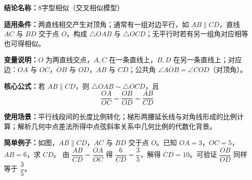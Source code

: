 \textbf{结论名称：}8字型相似（交叉相似模型）  

\textbf{适用条件：}两直线相交产生对顶角；通常有一组对边平行，如 $AB\parallel CD$，直线 $AC$ 与 $BD$ 交于点 $O$，构成 $\triangle OAB$ 与 $\triangle OCD$；无平行时若有另一组角对应相等也可得相似。  

\textbf{变量说明：}$O$ 为两直线交点，$A,C$ 在一条直线上，$B,D$ 在另一条直线上；对应边：$OA$ 与 $OC$，$OB$ 与 $OD$，$AB$ 与 $CD$；公共角 $\angle AOB = \angle COD$（对顶角）。  

\textbf{核心公式：}若 $AB\parallel CD$，则 $\triangle OAB \sim \triangle OCD$，且  
\[
\boxed{\frac{OA}{OC} = \frac{OB}{OD} = \frac{AB}{CD}}
\]  

\textbf{使用场景：}平行线段间的长度比例转化；梯形两腰延长线与对角线形成的比例计算；解析几何中点差法所得中点弦斜率关系中几何比例的代数化背景。  

\textbf{简单例子：}如图，$AB\parallel CD$，$AC$ 与 $BD$ 交于点 $O$。已知 $OA=3$，$OC=5$，$AB=6$，求 $CD$。  
由 $\dfrac{AB}{CD}=\dfrac{OA}{OC}$ 得 $\dfrac{6}{CD}=\dfrac{3}{5}$，解得 $CD=10$。可验证 $\dfrac{OB}{OD}$ 同样等于 $\dfrac{3}{5}$。
